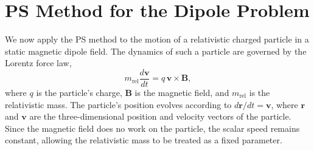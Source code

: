 \documentclass{article}
\begin{document}
\section{PS Method for the Dipole Problem}\label{sec:dipole}
We now apply the PS method to the motion of a relativistic charged particle in a static magnetic dipole field. The dynamics of such a particle are governed by the Lorentz force law,
        \begin{equation*}
           m_{\text{rel}}\frac{d\mathbf{v}}{dt}=q\,\mathbf{v}\times\mathbf{B},
        \end{equation*}
where $q$ is the particle's charge, $\mathbf{B}$ is the magnetic field, and $m_{\text{rel}}$ is the relativistic mass. The particle's position evolves according to $d\mathbf{r}/dt=\mathbf{v}$, where $\mathbf{r}$ and $\mathbf{v}$ are the three-dimensional position and velocity vectors of the particle. Since the magnetic field does no work on the particle, the scalar speed remains constant, allowing the relativistic mass to be treated as a fixed parameter.
\end{document}
